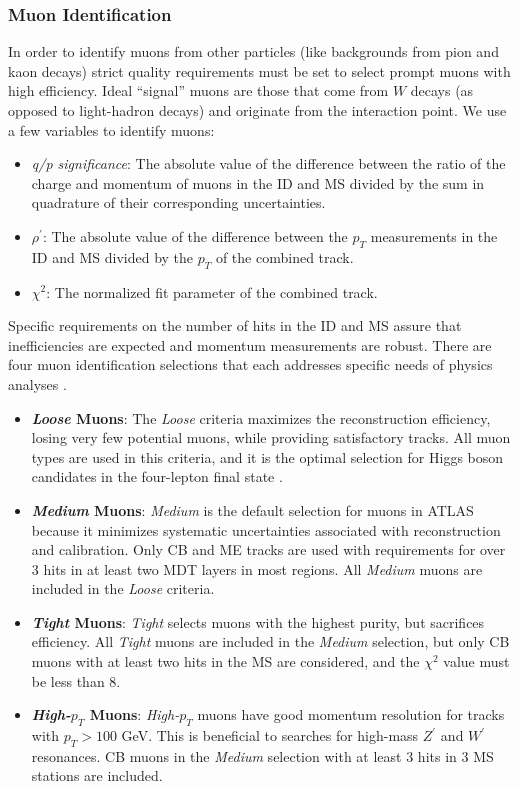 \subsubsection{Muon Identification}
In order to identify muons from other particles (like backgrounds from pion and kaon decays) strict quality requirements must be set to select prompt muons with high efficiency. Ideal ``signal'' muons are those that come from $W$ decays (as opposed to light-hadron decays) and originate from the interaction point. We use a few variables to identify muons:
\begin{itemize}
\item \textit{q/p significance}: The absolute value of the difference between the ratio of the charge and momentum of muons in the ID and MS divided by the sum in quadrature of their corresponding uncertainties.
\item \textit{$\rho^\prime$}: The absolute value of the difference between the $p_T$ measurements in the ID and MS divided by the $p_T$ of the combined track. 
\item \textit{$\chi ^2$}: The normalized fit parameter of the combined track.
\end{itemize}

Specific requirements on the number of hits in the ID and MS assure that inefficiencies are expected and momentum measurements are robust. There are four muon identification selections that each addresses specific needs of physics analyses \cite{MCPpaper}.

\begin{itemize}
\item \textbf{\textit{Loose} Muons}: The \textit{Loose} criteria maximizes the reconstruction efficiency, losing very few potential muons, while providing satisfactory tracks. All muon types are used in this criteria, and it is the optimal selection for Higgs boson candidates in the four-lepton final state \cite{4l}.
\item \textbf{\textit{Medium} Muons}: \textit{Medium} is the default selection for muons in ATLAS because it minimizes systematic uncertainties associated with reconstruction and calibration. Only CB and ME tracks are used with requirements for over 3 hits in at least two MDT layers in most regions. All \textit{Medium} muons are included in the \textit{Loose} criteria.
\item \textbf{\textit{Tight} Muons}: \textit{Tight} selects muons with the highest purity, but sacrifices efficiency. All \textit{Tight} muons are included in the \textit{Medium} selection, but only CB muons with at least two hits in the MS are considered, and the $\chi^2$ value must be less than $8$.  
\item \textbf{\textit{High-$p_T$} Muons}: \textit{High-$p_T$} muons have good momentum resolution for tracks with $p_T > 100$ GeV. This is beneficial to searches for high-mass $Z^\prime$ and $W^\prime$ resonances. CB muons in the \textit{Medium} selection with at least $3$ hits in $3$ MS stations are included. 
\end{itemize}

